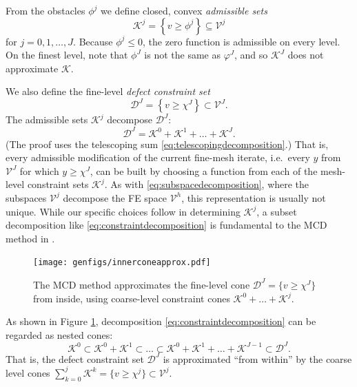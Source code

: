\documentclass[letterpaper,final,12pt,reqno]{amsart}
\theoremstyle{claim}
\numberwithin{equation}{section}
\numberwithin{figure}{section}
\numberwithin{table}{section}
\numberwithin{theorem}{section}
\begin{document}
From the obstacles $\phi^j$ we define closed, convex \emph{admissible sets}
\begin{equation}
\mathcal{K}^j = \left\{v \ge \phi^j\right\} \subseteq \mathcal{V}^j \label{eq:defineKj}
\end{equation}
for $j=0,1,\dots,J$.  Because $\phi^j \le 0$, the zero function is admissible on every level.  On the finest level, note that $\phi^J$ is not the same as $\varphi^J$, and so $\mathcal{K}^J$ does not approximate $\mathcal{K}$.

We also define the fine-level \emph{defect constraint set}
\begin{equation}
  \mathcal{D}^J = \left\{v \ge \chi^J\right\} \subset \mathcal{V}^J.  \label{eq:constraintset}
\end{equation}
The admissible sets $\mathcal{K}^j$ decompose $\mathcal{D}^J$:
\begin{equation}
  \mathcal{D}^J = \mathcal{K}^0 + \mathcal{K}^1 + \dots + \mathcal{K}^J. \label{eq:constraintdecomposition}
\end{equation}
(The proof uses the telescoping sum \eqref{eq:telescopingdecomposition}.)  That is, every admissible modification of the current fine-mesh iterate, i.e.~every $y$ from $\mathcal{V}^J$ for which $y\ge \chi^J$, can be built by choosing a function from each of the mesh-level constraint sets $\mathcal{K}^j$.  As with \eqref{eq:subspacedecomposition}, where the subspaces $\mathcal{V}^j$ decompose the FE space $\mathcal{V}^h$, this representation is usually not unique.  While our specific choices follow \cite{GraeserKornhuber2009} in determining $\mathcal{K}^j$, a subset decomposition like \eqref{eq:constraintdecomposition} is fundamental to the MCD method in \cite{Tai2003}.

\begin{figure}
\texttt{[image: genfigs/innerconeapprox.pdf]}

\caption{The MCD method approximates the fine-level cone $\mathcal{D}^J = \{v\ge \chi^J\}$ from inside, using coarse-level constraint cones $\mathcal{K}^0+\dots+\mathcal{K}^j$.}
\label{fig:innerconeapprox}
\end{figure}

As shown in Figure \ref{fig:innerconeapprox}, decomposition \eqref{eq:constraintdecomposition} can be regarded as nested cones:
\begin{equation}
  \mathcal{K}^0 \subset \mathcal{K}^0 + \mathcal{K}^1 \subset \dots \subset \mathcal{K}^0 + \mathcal{K}^1 + \dots + \mathcal{K}^{J-1} \subset \mathcal{D}^J.  \label{eq:nestedcones}
\end{equation}
That is, the defect constraint set $\mathcal{D}^J$ is approximated ``from within'' by the coarse level cones $\sum_{k=0}^j \mathcal{K}^k = \{v \ge \chi^j\} \subset \mathcal{V}^j$.
\end{document}
